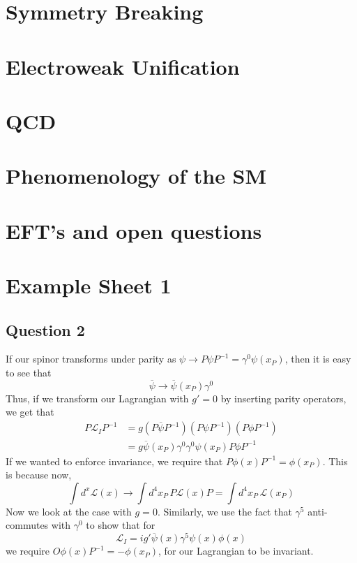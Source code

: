 \documentclass[11pt, oneside]{article}   	%
\theoremstyle{slanted}
\begin{document}
\section{Symmetry Breaking}%
\label{sec:symmetry_breaking}

\section{Electroweak Unification}%
\label{sec:electroweak_unification}

\section{QCD}%
\label{sec:qcd}

\section{Phenomenology of the SM}%
\label{sec:phenomenology_of_the_sm}

\section{EFT's and open questions}%
\label{sec:eft_s_and_open_questions}



\pagebreak 
\section*{Example Sheet 1}


\subsection*{Question 2}
If our spinor transforms under parity as $ \psi \to P \psi P ^{- 1} = \gamma ^  0 \psi \left( x_ P  \right)  $, 
then it is easy to see that 
\[
	\overline{ \psi } \to \overline{\psi } \left( x _ P   \right) \gamma ^  0 
\] Thus, 
if we transform our Lagrangian with $ g' = 0 $  by inserting 
parity operators,
we get that 
\begin{align*}
	P \mathcal{ L } _ I P ^{ - 1 } &=  
	g \left( P \overline{ \psi } P ^{ - 1 }  \right) \left( P 
	\psi P ^{ - 1 } \right)  \left( P \phi P ^{ -1 }  \right)  
	\\
				       &=  g \overline{ \psi } \left( x _P  \right) 
				       \gamma ^ 0 \gamma ^  0 \psi \left( x _ P  \right)  
				       P \phi P ^{ - 1 } 
\end{align*}
If we wanted to enforce 
invariance, we require that $ P \phi \left( x  \right)  P ^{-1 }  = \phi \left( x _ P   \right)  $. This is because now, 
\[
	\int d ^ x \mathcal{ L }\left( x  \right)  
	\to \int d ^ 4 x_ P \, P \mathcal{ L }\left( x  \right)   P 
	= \int d ^ 4 x _ P \, \mathcal{ L } \left( x _ P  \right)  
\] 
Now we look at the case with $ g  =0 $. 
Similarly, we use the fact that $ \gamma ^ 5 $ anti-commutes 
with $ \gamma ^  0$  to show that for  
\[
	\mathcal{ L } _ I  = i g' \overline{ \psi } \left( x  \right)
	\gamma ^ 5 \psi \left( x  \right)  \phi \left(  x  \right) 
\] we require $ O \phi \left( x  \right)  P ^{ - 1 }  =  - \phi \left( x _ P  \right)  $, 
for our Lagrangian to be invariant. 
\end{document}
